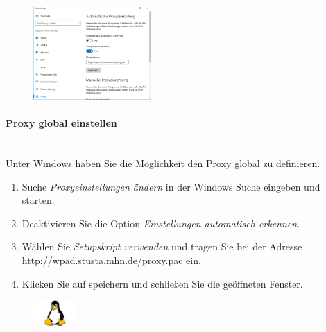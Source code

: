 \documentclass[a4paper,12pt]{scrartcl}
\begin{document}
\begin{figure}
	\begin{center}
		\includegraphics[width=0.4\textwidth,keepaspectratio]{Bilder/Proxy_Edge}
	\end{center}
\end{figure}

\paragraph*{Proxy global einstellen} ~\\

Unter Windows haben Sie die Möglichkeit den Proxy global zu definieren.

\begin{enumerate}
	\item Suche \textit{Proxyeinstellungen ändern} in der Windows Suche eingeben und starten.
	\item Deaktivieren Sie die Option \emph{Einstellungen automatisch erkennen}.
	\item Wählen Sie \emph{Setupskript verwenden} und tragen Sie bei der Adresse \\ \url{http://wpad.stusta.mhn.de/proxy.pac} ein.
	\item Klicken Sie auf speichern und schließen Sie die geöffneten Fenster.
\end{enumerate}



\pagebreak

\begin{figure}[t!]
	\raggedleft
	\vspace{-20pt}
	\includegraphics[height=1cm,keepaspectratio]{Bilder/linux_logo_neu}
	\vspace{-30pt}
\end{figure}
\end{document}
